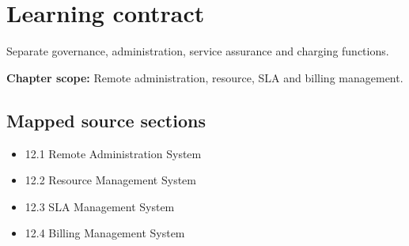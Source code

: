 \documentclass[10pt,letterpaper]{article}
\begin{document}
\sourceStatement
\tableofcontents
\newpage
\section{Learning contract}
\begin{takeaway}
Separate governance, administration, service assurance and charging functions.
\end{takeaway}
\textbf{Chapter scope:} Remote administration, resource, SLA and billing management.\\
\subsection{Mapped source sections}
\begin{itemize}
\item 12.1 Remote Administration System
\item 12.2 Resource Management System
\item 12.3 SLA Management System
\item 12.4 Billing Management System
\end{itemize}
\end{document}
